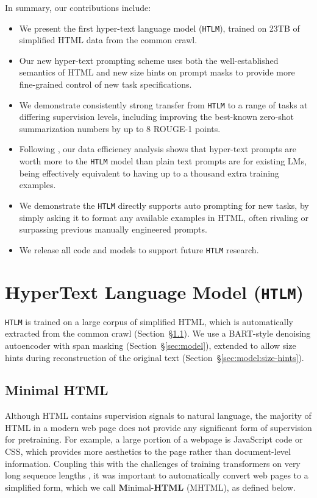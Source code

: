 \documentclass[11pt,a4paper]{article}
\newcommand{\HTLM}{\texttt{HTLM}}
\begin{document}
In summary, our contributions include:
\begin{itemize}
    \item We present the first hyper-text language model (\HTLM{}), trained on 23TB of simplified HTML data from the common crawl. 
    \item Our new hyper-text prompting scheme uses both the well-established semantics of HTML and new size hints on prompt masks to provide more fine-grained control of new task specifications. 
    \item We demonstrate consistently strong transfer from \HTLM{} to a range of tasks at differing supervision levels, including improving the best-known zero-shot summarization numbers by up to 8 ROUGE-1 points.
    \item Following \citet{how_many_datapoints}, our data efficiency analysis shows that hyper-text prompts are worth more to the \HTLM{} model than plain text prompts are for existing LMs, being effectively equivalent to having up to a thousand extra training examples. 
    \item We demonstrate the \HTLM{} directly supports auto prompting for new tasks, by simply asking it to format any available examples in HTML, often rivaling or surpassing previous manually engineered prompts. 
    \item We release all code and models to support future \HTLM{} research.
\end{itemize}


\section{HyperText Language Model (\HTLM{})}
\HTLM{} is trained on a large corpus of simplified HTML, which is automatically extracted from the common crawl (Section~\S\ref{sec:mhtml}). We use a BART-style denoising autoencoder with span masking (Section~\S\ref{sec:model}), extended to allow size hints during reconstruction of the original text (Section~\S\ref{sec:model:size-hints}). 

\subsection{Minimal HTML}
\label{sec:mhtml}
Although HTML contains supervision signals to natural language, the majority of HTML in a modern web page does not provide any significant form of supervision for pretraining. For example, a large portion of a webpage is JavaScript code or CSS, which provides more aesthetics to the page rather than document-level information. Coupling this with the challenges of training transformers on very long sequence lengths \citep{performer, linformer, longformer}, it was important to automatically convert web pages to a simplified form, which we call \textbf{M}inimal-\textbf{HTML} (MHTML), as defined below.
\end{document}
